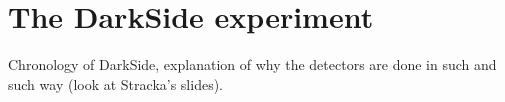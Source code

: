 \chapter{The DarkSide experiment}

Chronology of DarkSide, explanation of why the detectors are done in such and
such way (look at Stracka's slides).

